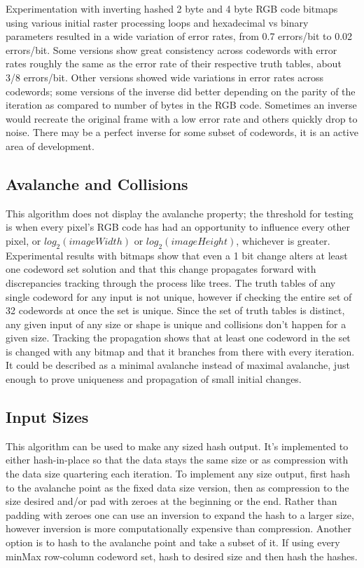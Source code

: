 \documentclass[11pt]{article}
\begin{document}
Experimentation with inverting hashed 2 byte and 4 byte RGB code bitmaps using various initial raster processing loops and hexadecimal vs binary parameters resulted in a wide variation of error rates, from 0.7 errors/bit to 0.02 errors/bit. Some versions show great consistency across codewords with error rates roughly the same as the error rate of their respective truth tables, about 3/8 errors/bit. Other versions showed wide variations in error rates across codewords; some versions of the inverse did better depending on the parity of the iteration as compared to number of bytes in the RGB code. Sometimes an inverse would recreate the original frame with a low error rate and others quickly drop to noise. There may be a perfect inverse for some subset of codewords, it is an active area of development.\\


\subsection{Avalanche and Collisions}
This algorithm does not display the avalanche property; the threshold for testing is when every pixel's RGB code has had an opportunity to influence every other pixel, or $log_2(imageWidth)$ or $log_2(imageHeight)$, whichever is greater. Experimental results with bitmaps show that even a 1 bit change alters at least one codeword set solution and that this change propagates forward with discrepancies tracking through the process like trees. The truth tables of any single codeword for any input is not unique, however if checking the entire set of 32 codewords at once the set is unique. Since the set of truth tables is distinct, any given input of any size or shape is unique and collisions don't happen for a given size. Tracking the propagation shows that at least one codeword in the set is changed with any bitmap and that it branches from there with every iteration. It could be described as a minimal avalanche instead of maximal avalanche, just enough to prove uniqueness and propagation of small initial changes.\\

\subsection{Input Sizes}
This algorithm can be used to make any sized hash output. It's implemented to either hash-in-place so that the data stays the same size or as compression with the data size quartering each iteration. To implement any size output, first hash to the avalanche point as the fixed data size version, then as compression to the size desired and/or pad with zeroes at the beginning or the end. Rather than padding with zeroes one can use an inversion to expand the hash to a larger size, however inversion is more computationally expensive than compression. Another option is to hash to the avalanche point and take a subset of it. If using every minMax row-column codeword set, hash to desired size and then hash the hashes.\\
\end{document}
